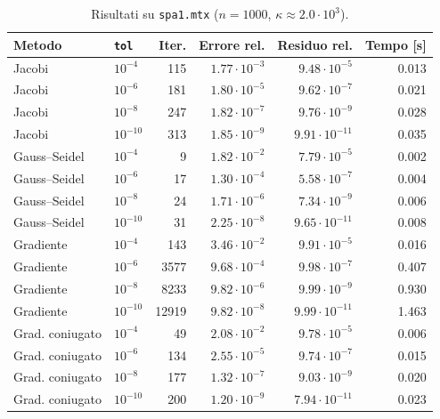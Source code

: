 \documentclass[11pt,a4paper]{article}
\begin{document}
\newcommand{\restab}[2]{%
\begin{table}[H]
\centering
\caption{#2}
\label{tab:#1}
\small
\begin{tabular}{llrrrr}
\toprule
Metodo & \texttt{tol} & Iter. & Errore rel. & Residuo rel. & Tempo [s] \\
\midrule
}
\newcommand{\restabend}{\bottomrule\end{tabular}\end{table}}

\restab{spa1}{Risultati su \texttt{spa1.mtx} ($n=1000$, $\kappa\approx2.0\cdot10^{3}$).}
Jacobi & $10^{-4}$ & 115 & $1.77\cdot10^{-3}$ & $9.48\cdot10^{-5}$ & 0.013 \\
Jacobi & $10^{-6}$ & 181 & $1.80\cdot10^{-5}$ & $9.62\cdot10^{-7}$ & 0.021 \\
Jacobi & $10^{-8}$ & 247 & $1.82\cdot10^{-7}$ & $9.76\cdot10^{-9}$ & 0.028 \\
Jacobi & $10^{-10}$ & 313 & $1.85\cdot10^{-9}$ & $9.91\cdot10^{-11}$ & 0.035 \\
\midrule
Gauss--Seidel & $10^{-4}$ & 9 & $1.82\cdot10^{-2}$ & $7.79\cdot10^{-5}$ & 0.002 \\
Gauss--Seidel & $10^{-6}$ & 17 & $1.30\cdot10^{-4}$ & $5.58\cdot10^{-7}$ & 0.004 \\
Gauss--Seidel & $10^{-8}$ & 24 & $1.71\cdot10^{-6}$ & $7.34\cdot10^{-9}$ & 0.006 \\
Gauss--Seidel & $10^{-10}$ & 31 & $2.25\cdot10^{-8}$ & $9.65\cdot10^{-11}$ & 0.008 \\
\midrule
Gradiente & $10^{-4}$ & 143 & $3.46\cdot10^{-2}$ & $9.91\cdot10^{-5}$ & 0.016 \\
Gradiente & $10^{-6}$ & 3577 & $9.68\cdot10^{-4}$ & $9.98\cdot10^{-7}$ & 0.407 \\
Gradiente & $10^{-8}$ & 8233 & $9.82\cdot10^{-6}$ & $9.99\cdot10^{-9}$ & 0.930 \\
Gradiente & $10^{-10}$ & 12919 & $9.82\cdot10^{-8}$ & $9.99\cdot10^{-11}$ & 1.463 \\
\midrule
Grad. coniugato & $10^{-4}$ & 49 & $2.08\cdot10^{-2}$ & $9.78\cdot10^{-5}$ & 0.006 \\
Grad. coniugato & $10^{-6}$ & 134 & $2.55\cdot10^{-5}$ & $9.74\cdot10^{-7}$ & 0.015 \\
Grad. coniugato & $10^{-8}$ & 177 & $1.32\cdot10^{-7}$ & $9.03\cdot10^{-9}$ & 0.020 \\
Grad. coniugato & $10^{-10}$ & 200 & $1.20\cdot10^{-9}$ & $7.94\cdot10^{-11}$ & 0.023 \\
\restabend
\end{document}
